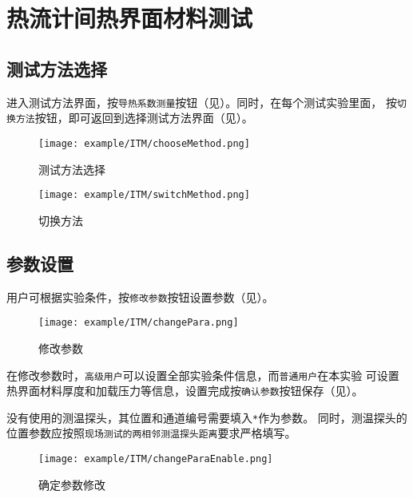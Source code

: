 \section{热流计间热界面材料测试}
\subsection{测试方法选择}
进入测试方法界面，按\lstinline{导热系数测量}按钮（见）。同时，在每个测试实验里面，
按\lstinline{切换方法}按钮，即可返回到选择测试方法界面（见）。
\begin{figure}[htbp]
	\centering
	\texttt{[image: example/ITM/chooseMethod.png]}
	\caption{ 测试方法选择 \label{fig:exmp_itm_chooseMethod}}
\end{figure}

\begin{figure}[htbp]
	\centering
	\texttt{[image: example/ITM/switchMethod.png]}
	\caption{ 切换方法 \label{fig:exmp_itm_switchMethod}}
\end{figure}

\subsection{参数设置}
用户可根据实验条件，按\lstinline{修改参数}按钮设置参数（见）。
\begin{figure}[htbp]
	\centering
	\texttt{[image: example/ITM/changePara.png]}
	\caption{ 修改参数 \label{fig:exmp_itm_changePara}}
\end{figure}
在修改参数时，\lstinline{高级用户}可以设置全部实验条件信息，而\lstinline{普通用户}在本实验
可设置热界面材料厚度和加载压力等信息，设置完成按\lstinline{确认参数}按钮保存（见）。
\begin{note}
没有使用的测温探头，其位置和通道编号需要填入\lstinline{*}作为参数。
同时，测温探头的位置参数应按照\lstinline{现场测试的两相邻测温探头距离}要求严格填写。
\end{note}
\begin{figure}[htbp]
	\centering
	\texttt{[image: example/ITM/changeParaEnable.png]}
	\caption{ 确定参数修改 \label{fig:exmp_itm_changeParaEnable}}
\end{figure}
~\\
